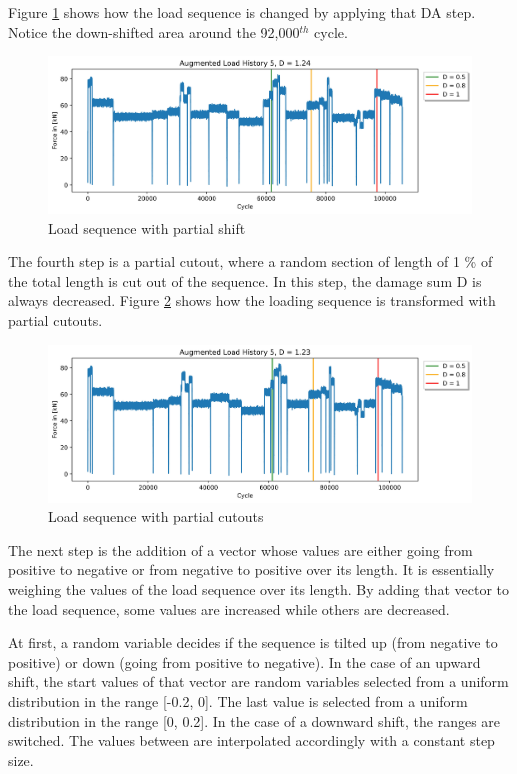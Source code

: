 Figure \ref{fig:Verlauf_5_shift_partial} shows how the load sequence is changed by applying that DA step. Notice the down-shifted area around the 92,000\(^{th}\) cycle.


\begin{figure}[H]
	\centering
	\includegraphics[width=1\linewidth]{IMGs/Verlauf_5_shift_partial.jpg}
	\caption{Load sequence with partial shift}
	\label{fig:Verlauf_5_shift_partial}
\end{figure}
\newpage
The fourth step is a partial cutout, where a random section of length of 1 \% of the total length is cut out of the sequence. In this step, the damage sum D is always decreased. Figure \ref{fig:Verlauf_5_cutout} shows how the loading sequence is transformed with partial cutouts.

\begin{figure}[H]
	\centering
	\includegraphics[width=1\linewidth]{IMGs/Verlauf_5_coutout.jpg}
	\caption{Load sequence with partial cutouts}
	\label{fig:Verlauf_5_cutout}
\end{figure}

The next step is the addition of a vector whose values are either going from positive to negative or from negative to positive over its length. It is essentially weighing the values of the load sequence over its length. By adding that vector to the load sequence, some values are increased while others are decreased. 

At first, a random variable decides if the sequence is tilted up (from negative to positive) or down (going from positive to negative). In the case of an upward shift, the start values of that vector are random variables selected from a uniform distribution in the range [-0.2, 0]. The last value is selected from a uniform distribution in the range [0, 0.2]. In the case of a downward shift, the ranges are switched.
The values between are interpolated accordingly with a constant step size.

